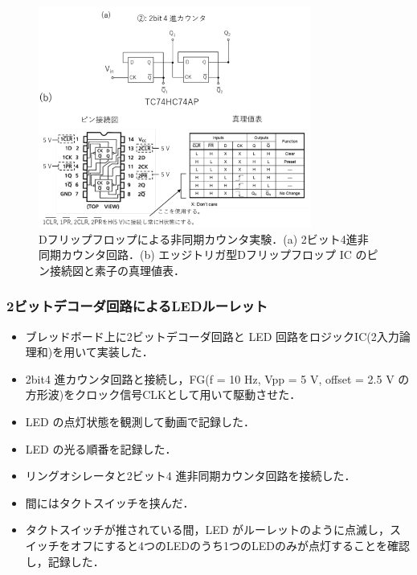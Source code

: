 \documentclass{ltjsarticle}
\begin{document}
\begin{figure}[H]
  \centering
  \includegraphics[width=0.8\textwidth]{figs/DFlipFropProcedure.png}
  \caption{Dフリップフロップによる非同期カウンタ実験．(a) 2ビット4進非同期カウンタ回路．(b) エッジトリガ型Dフリップフロップ IC のピン接続図と素子の真理値表．}
  \label{fig:2bit4counter}
\end{figure}

\subsubsection{2ビットデコーダ回路によるLEDルーレット}
\begin{itemize}
  \item ブレッドボード上に2ビットデコーダ回路と LED 回路をロジックIC(2入力論理和)を用いて実装した．
  \item 2bit4 進カウンタ回路と接続し，FG(f = 10 Hz, Vpp = 5 V, offset = 2.5 V の方形波)をクロック信号CLKとして用いて駆動させた．
  \item LED の点灯状態を観測して動画で記録した．
  \item LED の光る順番を記録した．
\end{itemize}

\begin{itemize}
  \item リングオシレータと2ビット4 進非同期カウンタ回路を接続した．
  \item 間にはタクトスイッチを挟んだ．
  \item タクトスイッチが推されている間，LED がルーレットのように点滅し，スイッチをオフにすると4つのLEDのうち1つのLEDのみが点灯することを確認し，記録した．
\end{itemize}
\end{document}
